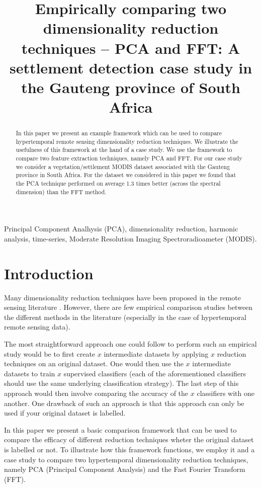 \documentclass{article}
\title{Empirically comparing two dimensionality reduction techniques -- PCA and FFT: A settlement detection case study in the Gauteng province of South Africa}
\begin{document}
%
\maketitle
%
\begin{abstract}
In this paper we present an example framework which can be used to compare hypertemporal remote sensing dimensionality reduction techniques. 
We illustrate the usefulness of this framework at the hand of a case study. We use the framework to compare two 
feature extraction techniques, namely PCA and FFT. For our case study we consider a vegetation/settlement MODIS dataset associated with the Gauteng province in South Africa. 
For the dataset we considered in this paper we found that the PCA technique performed on average 1.3 times better (across the spectral dimension) than the FFT method.
\end{abstract}
%
\begin{keywords}
Principal Component Analhysis (PCA), dimensionality reduction, harmonic analysis, time-series, Moderate Resolution Imaging Spectroradioameter (MODIS).
\end{keywords}
%

\section{Introduction}
\label{sec:intro}

Many dimensionality reduction techniques have been proposed in the remote sensing literature \cite{grobler2012}. However, there are few empirical comparison studies between the different methods
in the literature (especially in the case of hypertemporal remote sensing data). 

The most straightforward approach one could follow to perform such an empirical 
study would be to first create $x$ intermediate datasets by applying $x$ reduction techniques on an original dataset. One would then use the $x$ intermediate 
datasets to train $x$ supervised classifiers (each of the aforementioned classifiers should use the same underlying classification strategy). The last step of this approach would then 
involve comparing the accuracy of the $x$ classifiers with one another. One drawback of such an approach is that this approach can only be used if your original dataset is 
labelled. 

In this paper we present a basic comparison framework that can be used to compare the 
efficacy of different reduction techniques wheter the original dataset is labelled or not. To illustrate how this framework functions, we employ it and a case study to compare two hypertemporal 
dimensionality reduction techniques, namely PCA (Principal Component Analysis) and the Fast Fourier Transform (FFT).
\end{document}
